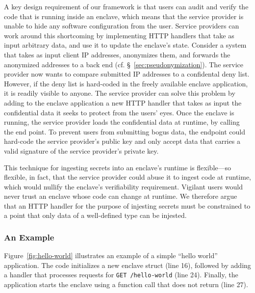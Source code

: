 A key design requirement of our framework is that users can audit and verify the
code that is running inside an enclave, which means that the service provider is
unable to hide any software configuration from the user.  Service providers can
work around this shortcoming by implementing HTTP handlers that take as input
arbitrary data, and use it to update the enclave's state.  Consider a system
that takes as input client IP addresses, anonymizes them, and forwards the
anonymized addresses to a back end (cf. \S~\ref{sec:pseudonymization}).  The
service provider now wants to compare submitted IP addresses to a confidental
deny list.  However, if the deny list is hard-coded in the freely available
enclave application, it is readily visible to anyone.  The service provider can
solve this problem by adding to the enclave application a new HTTP handler that
takes as input the confidential data it seeks to protect from the users' eyes.
Once the enclave is running, the service provider loads the confidential data
at runtime, by calling the end point.  To prevent users from submitting bogus
data, the endpoint could hard-code the service provider's public key and only
accept data that carries a valid signature of the service provider's private
key.

This technique for ingesting secrets into an enclave's runtime is flexible---so
flexible, in fact, that the service provider could abuse it to ingest code at
runtime, which would nullify the enclave's verifiability requirement.  Vigilant
users would never trust an enclave whose code can change at runtime.  We
therefore argue that an HTTP handler for the purpose of injesting secrets must
be constrained to a point that only data of a well-defined type can be injested.

\subsubsection{An Example}
\label{sec:example}

Figure~\ref{fig:hello-world} illustrates an example of a simple ``hello world''
application.  The code initializes a new enclave struct (line 16), followed by
adding a handler that processes requests for \texttt{GET /hello-world} (line
24).  Finally, the application starts the enclave using a function call that
does not return (line 27).

